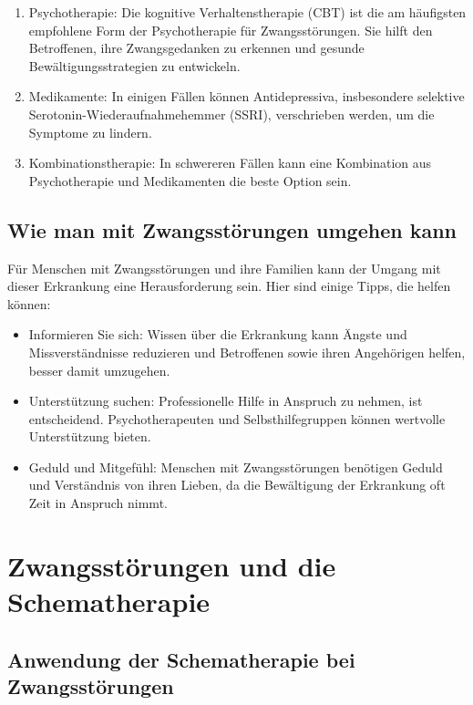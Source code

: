 \begin{enumerate}
  \item Psychotherapie: Die kognitive Verhaltenstherapie (CBT) ist die am häufigsten empfohlene Form der Psychotherapie für Zwangsstörungen. Sie hilft den Betroffenen, ihre Zwangsgedanken zu erkennen und gesunde Bewältigungsstrategien zu entwickeln.
  
  \item Medikamente: In einigen Fällen können Antidepressiva, insbesondere selektive Serotonin-Wiederaufnahmehemmer (SSRI), verschrieben werden, um die Symptome zu lindern.
  
  \item Kombinationstherapie: In schwereren Fällen kann eine Kombination aus Psychotherapie und Medikamenten die beste Option sein.
\end{enumerate}

\subsection{Wie man mit Zwangsstörungen umgehen kann}

Für Menschen mit Zwangsstörungen und ihre Familien kann der Umgang mit dieser Erkrankung eine Herausforderung sein. Hier sind einige Tipps, die helfen können:

\begin{itemize}
  \item Informieren Sie sich: Wissen über die Erkrankung kann Ängste und Missverständnisse reduzieren und Betroffenen sowie ihren Angehörigen helfen, besser damit umzugehen.
  
  \item Unterstützung suchen: Professionelle Hilfe in Anspruch zu nehmen, ist entscheidend. Psychotherapeuten und Selbsthilfegruppen können wertvolle Unterstützung bieten.
  
  \item Geduld und Mitgefühl: Menschen mit Zwangsstörungen benötigen Geduld und Verständnis von ihren Lieben, da die Bewältigung der Erkrankung oft Zeit in Anspruch nimmt.
\end{itemize}
\section{Zwangsstörungen und die Schematherapie}

\subsection{Anwendung der Schematherapie bei Zwangsstörungen}

